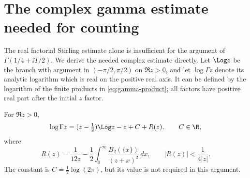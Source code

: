 \section{The complex gamma estimate needed for counting}
\label{sec:stirling}

The real factorial Stirling estimate alone is insufficient for the
argument of $\Gamma(1/4+\ii T/2)$. We derive the needed complex estimate
directly. Let $\Log z$ be the branch with argument in
$(-\pi/2,\pi/2)$ on $\Re z>0$, and let $\log\Gamma z$ denote its
analytic logarithm which is real on the positive real axis. It can be
defined by the logarithm of the finite products in
\eqref{eq:gamma-product}; all factors have positive real part after
the initial $z$ factor.

\begin{lemma}
For $\Re z>0$,
\begin{equation}
 \log\Gamma z=(z-\tfrac12)\Log z-z+C+R(z),\qquad C\in\R,
 \label{eq:complex-stirling}
\end{equation}
where
\begin{equation}
 R(z)=\frac1{12z}-\frac12\int_0^\infty
          \frac{B_2(\{x\})}{(z+x)^2}\,dx,
 \qquad |R(z)|<\frac1{4|z|}.
 \label{eq:gamma-remainder}
\end{equation}
The constant is $C=\tfrac12\log(2\pi)$, but its value is not required
in this argument.
\end{lemma}

